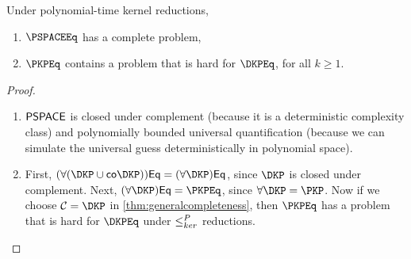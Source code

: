 \begin{corollary}\label{cor:hardproblems}
  Under polynomial-time kernel reductions,
  \begin{enumerate}
  \item $\PSPACEEq$ has a complete problem,
  \item $\PKPEq$ contains a problem that is hard for $\DKPEq$, for all $k \geq 1$.
  \end{enumerate}
\end{corollary}
\begin{proof}\mbox{}
  \begin{enumerate}
  \item ${\mathsf{PSPACE}}$ is closed under complement (because it is a deterministic complexity class) and polynomially bounded universal quantification (because we can simulate the universal guess deterministically in polynomial space).
  \item
    First, $(\forall(\DKP \cup \mathsf{co}\DKP))\mathsf{Eq} = (\forall \DKP)\mathsf{Eq}$, since $\DKP$ is closed under complement.  %
    Next, $(\forall \DKP)\mathsf{Eq} = \PKPEq$, since $\forall \DKP = \PKP$.  %
    Now if we choose $\mathcal{C} = \DKP$ in \autoref{thm:generalcompleteness}, then $\PKPEq$ has a problem that is hard for $\DKPEq$ under $\leq^{P}_{ker}$ reductions.
    \qedhere
  \end{enumerate}
\end{proof}

